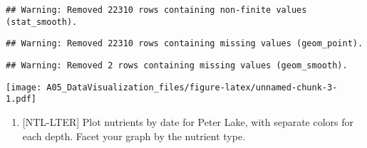 \documentclass[]{article}
\newenvironment{Shaded}{\begin{snugshade}}{\end{snugshade}}
\newcommand{\KeywordTok}[1]{\textcolor[rgb]{0.13,0.29,0.53}{\textbf{#1}}}
\newcommand{\DataTypeTok}[1]{\textcolor[rgb]{0.13,0.29,0.53}{#1}}
\newcommand{\DecValTok}[1]{\textcolor[rgb]{0.00,0.00,0.81}{#1}}
\newcommand{\StringTok}[1]{\textcolor[rgb]{0.31,0.60,0.02}{#1}}
\newcommand{\CommentTok}[1]{\textcolor[rgb]{0.56,0.35,0.01}{\textit{#1}}}
\newcommand{\OperatorTok}[1]{\textcolor[rgb]{0.81,0.36,0.00}{\textbf{#1}}}
\newcommand{\NormalTok}[1]{#1}
\providecommand{\tightlist}{%
  \setlength{\itemsep}{0pt}\setlength{\parskip}{0pt}}
\begin{document}
\begin{Shaded}
\end{Shaded}

\begin{verbatim}
## Warning: Removed 22310 rows containing non-finite values (stat_smooth).
\end{verbatim}

\begin{verbatim}
## Warning: Removed 22310 rows containing missing values (geom_point).
\end{verbatim}

\begin{verbatim}
## Warning: Removed 2 rows containing missing values (geom_smooth).
\end{verbatim}

\texttt{[image: A05\_DataVisualization\_files/figure-latex/unnamed-chunk-3-1.pdf]}

\begin{enumerate}
\def\labelenumi{\arabic{enumi}.}
\setcounter{enumi}{4}
\tightlist
\item
  {[}NTL-LTER{]} Plot nutrients by date for Peter Lake, with separate
  colors for each depth. Facet your graph by the nutrient type.
\end{enumerate}
\end{document}
